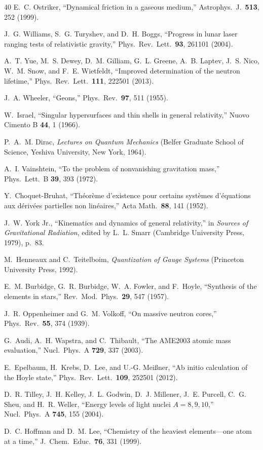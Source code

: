 \documentclass[aps,prd,preprint,superscriptaddress,showpacs,preprintnumbers,amsmath,amssymb,nofootinbib]{revtex4-2}
\begin{document}
\begin{thebibliography}{40}
E.~C. Ostriker, ``Dynamical friction in a gaseous medium,'' Astrophys.\ J.\ \textbf{513}, 252 (1999).

J.~G. Williams, S.~G. Turyshev, and D.~H. Boggs, ``Progress in lunar laser ranging tests of relativistic gravity,'' Phys.\ Rev.\ Lett.\ \textbf{93}, 261101 (2004).

A.~T. Yue, M.~S. Dewey, D.~M. Gilliam, G.~L. Greene, A.~B. Laptev, J.~S. Nico, W.~M. Snow, and F.~E. Wietfeldt, ``Improved determination of the neutron lifetime,'' Phys.\ Rev.\ Lett.\ \textbf{111}, 222501 (2013).

J.~A. Wheeler, ``Geons,'' Phys.\ Rev.\ \textbf{97}, 511 (1955).

W.~Israel, ``Singular hypersurfaces and thin shells in general relativity,'' Nuovo Cimento B \textbf{44}, 1 (1966).

P.~A.~M. Dirac, \emph{Lectures on Quantum Mechanics} (Belfer Graduate School of Science, Yeshiva University, New York, 1964).

A.~I. Vainshtein, ``To the problem of nonvanishing gravitation mass,'' Phys.\ Lett.\ B \textbf{39}, 393 (1972).

Y.~Choquet-Bruhat, ``Th\'eor\`eme d'existence pour certains syst\`emes d'\'equations aux d\'eriv\'ees partielles non lin\'eaires,'' Acta Math.\ \textbf{88}, 141 (1952).

J.~W. York Jr., ``Kinematics and dynamics of general relativity,'' in \emph{Sources of Gravitational Radiation}, edited by L.~L. Smarr (Cambridge University Press, 1979), p.~83.

M.~Henneaux and C.~Teitelboim, \emph{Quantization of Gauge Systems} (Princeton University Press, 1992).

E.~M. Burbidge, G.~R. Burbidge, W.~A. Fowler, and F.~Hoyle, ``Synthesis of the elements in stars,'' Rev.\ Mod.\ Phys.\ \textbf{29}, 547 (1957).

J.~R. Oppenheimer and G.~M. Volkoff, ``On massive neutron cores,'' Phys.\ Rev.\ \textbf{55}, 374 (1939).

G.~Audi, A.~H. Wapstra, and C.~Thibault, ``The AME2003 atomic mass evaluation,'' Nucl.\ Phys.\ A \textbf{729}, 337 (2003).

E.~Epelbaum, H.~Krebs, D.~Lee, and U.-G. Mei{\ss}ner, ``Ab initio calculation of the Hoyle state,'' Phys.\ Rev.\ Lett.\ \textbf{109}, 252501 (2012).

D.~R. Tilley, J.~H. Kelley, J.~L. Godwin, D.~J. Millener, J.~E. Purcell, C.~G. Sheu, and H.~R. Weller, ``Energy levels of light nuclei $A = 8, 9, 10$,'' Nucl.\ Phys.\ A \textbf{745}, 155 (2004).

D.~C. Hoffman and D.~M. Lee, ``Chemistry of the heaviest elements---one atom at a time,'' J.\ Chem.\ Educ.\ \textbf{76}, 331 (1999).

\end{thebibliography}
\end{document}
